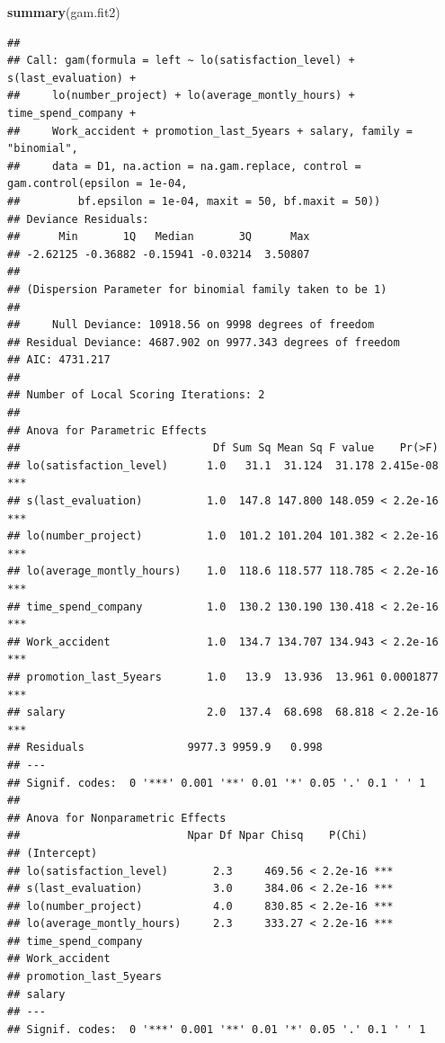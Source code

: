 \documentclass[
  11pt,
]{article}
\newenvironment{Shaded}{\begin{snugshade}}{\end{snugshade}}
\newcommand{\FunctionTok}[1]{\textcolor[rgb]{0.13,0.29,0.53}{\textbf{#1}}}
\newcommand{\NormalTok}[1]{#1}
\begin{document}
\begin{Shaded}
\begin{Highlighting}[]
\FunctionTok{summary}\NormalTok{(gam.fit2)}
\end{Highlighting}
\end{Shaded}

\begin{verbatim}
## 
## Call: gam(formula = left ~ lo(satisfaction_level) + s(last_evaluation) + 
##     lo(number_project) + lo(average_montly_hours) + time_spend_company + 
##     Work_accident + promotion_last_5years + salary, family = "binomial", 
##     data = D1, na.action = na.gam.replace, control = gam.control(epsilon = 1e-04, 
##         bf.epsilon = 1e-04, maxit = 50, bf.maxit = 50))
## Deviance Residuals:
##      Min       1Q   Median       3Q      Max 
## -2.62125 -0.36882 -0.15941 -0.03214  3.50807 
## 
## (Dispersion Parameter for binomial family taken to be 1)
## 
##     Null Deviance: 10918.56 on 9998 degrees of freedom
## Residual Deviance: 4687.902 on 9977.343 degrees of freedom
## AIC: 4731.217 
## 
## Number of Local Scoring Iterations: 2 
## 
## Anova for Parametric Effects
##                              Df Sum Sq Mean Sq F value    Pr(>F)    
## lo(satisfaction_level)      1.0   31.1  31.124  31.178 2.415e-08 ***
## s(last_evaluation)          1.0  147.8 147.800 148.059 < 2.2e-16 ***
## lo(number_project)          1.0  101.2 101.204 101.382 < 2.2e-16 ***
## lo(average_montly_hours)    1.0  118.6 118.577 118.785 < 2.2e-16 ***
## time_spend_company          1.0  130.2 130.190 130.418 < 2.2e-16 ***
## Work_accident               1.0  134.7 134.707 134.943 < 2.2e-16 ***
## promotion_last_5years       1.0   13.9  13.936  13.961 0.0001877 ***
## salary                      2.0  137.4  68.698  68.818 < 2.2e-16 ***
## Residuals                9977.3 9959.9   0.998                      
## ---
## Signif. codes:  0 '***' 0.001 '**' 0.01 '*' 0.05 '.' 0.1 ' ' 1
## 
## Anova for Nonparametric Effects
##                          Npar Df Npar Chisq    P(Chi)    
## (Intercept)                                              
## lo(satisfaction_level)       2.3     469.56 < 2.2e-16 ***
## s(last_evaluation)           3.0     384.06 < 2.2e-16 ***
## lo(number_project)           4.0     830.85 < 2.2e-16 ***
## lo(average_montly_hours)     2.3     333.27 < 2.2e-16 ***
## time_spend_company                                       
## Work_accident                                            
## promotion_last_5years                                    
## salary                                                   
## ---
## Signif. codes:  0 '***' 0.001 '**' 0.01 '*' 0.05 '.' 0.1 ' ' 1
\end{verbatim}
\end{document}
